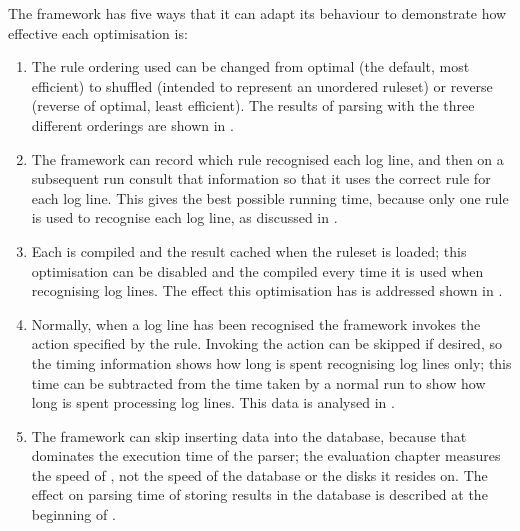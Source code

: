 The framework has five ways that it can adapt its behaviour to demonstrate
how effective each optimisation is:

\begin{enumerate}

    \item The rule ordering used can be changed from optimal (the default,
        most efficient) to shuffled (intended to represent an unordered
        ruleset) or reverse (reverse of optimal, least efficient).  The
        results of parsing with the three different orderings are shown in
        .

    \item The framework can record which rule recognised each log line, and
        then on a subsequent run consult that information so that it uses
        the correct rule for each log line.  This gives the best possible
        running time, because only one rule is used to recognise each log
        line, as discussed in .

    \item Each  is compiled and the result cached when the
        ruleset is loaded; this optimisation can be disabled and the
         compiled every time it is used when recognising log
        lines.  The effect this optimisation has is addressed shown in
        .

    \item Normally, when a log line has been recognised the framework
        invokes the action specified by the rule.  Invoking the action can
        be skipped if desired, so the timing information shows how long is
        spent recognising log lines only; this time can be subtracted from
        the time taken by a normal run to show how long is spent processing
        log lines.  This data is analysed in .

    \item The framework can skip inserting data into the database, because
        that dominates the execution time of the parser; the evaluation
        chapter measures the speed of \parsername{}, not the speed of the
        database or the disks it resides on.  The effect on parsing time of
        storing results in the database is described at the beginning of
        .

\end{enumerate}

